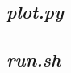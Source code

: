 \documentclass[12pt,letterpaper]{article}
\begin{document}
\newpage
\subsection{\textit{plot.py}}


\newpage
\subsection{\textit{run.sh}}






\end{document}

